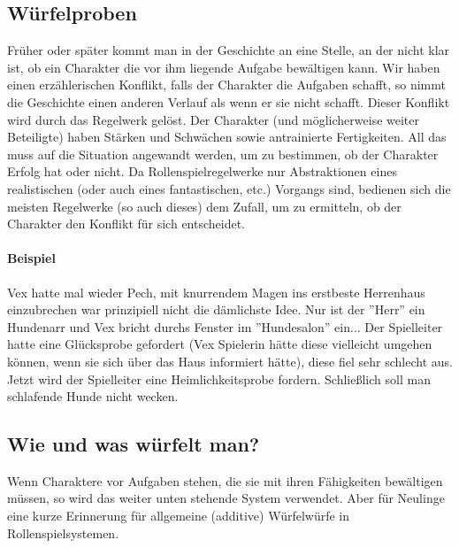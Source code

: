 \documentclass{article}
\begin{document}
\begin{center}
\section{Würfelproben}
\end{center}

Früher oder später kommt man in der Geschichte an eine Stelle, an der nicht klar ist, ob ein Charakter die vor ihm
liegende Aufgabe bewältigen kann. Wir haben einen erzählerischen Konflikt, falls der Charakter die Aufgaben schafft,
so nimmt die Geschichte einen anderen Verlauf als wenn er sie nicht schafft. Dieser Konflikt wird durch das Regelwerk
gelöst. Der Charakter (und möglicherweise weiter Beteiligte) haben Stärken und Schwächen sowie antrainierte
Fertigkeiten. All das muss auf die Situation angewandt werden, um zu bestimmen, ob der Charakter Erfolg hat oder nicht.
Da Rollenspielregelwerke nur Abstraktionen eines realistischen (oder auch eines fantastischen, etc.) Vorgangs sind,
bedienen sich die meisten Regelwerke (so auch dieses) dem Zufall, um zu ermitteln, ob der Charakter den Konflikt für
sich entscheidet.

\paragraph{Beispiel}

Vex hatte mal wieder Pech, mit knurrendem Magen ins erstbeste Herrenhaus einzubrechen war prinzipiell nicht die
dämlichste Idee. Nur ist der ''Herr'' ein Hundenarr und Vex bricht durchs Fenster im ''Hundesalon'' ein...
Der Spielleiter hatte eine Glücksprobe gefordert (Vex Spielerin hätte diese vielleicht umgehen können, wenn sie sich
über das Haus informiert hätte), diese fiel sehr schlecht aus. Jetzt wird der Spielleiter eine Heimlichkeitsprobe
fordern. Schließlich soll man schlafende Hunde nicht wecken.

\begin{center}
\subsection{Wie und was würfelt man?}
\end{center}

Wenn Charaktere vor Aufgaben stehen, die sie mit ihren Fähigkeiten bewältigen müssen, so wird das weiter unten stehende
System verwendet. Aber für Neulinge eine kurze Erinnerung für allgemeine (additive) Würfelwürfe in Rollenspielsystemen.
\end{document}
